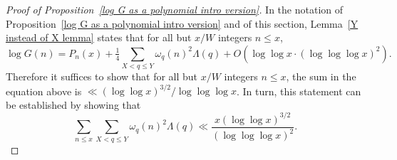 \documentclass[12pt,reqno]{amsart}
\theoremstyle{definition}
\begin{document}
\begin{proof}[Proof of Proposition~\ref{log G as a polynomial intro version}]
In the notation of Proposition~\ref{log G as a polynomial intro version} and of this section, Lemma~\ref{Y instead of X lemma} states that for all but $x/W$ integers $n\le x$,
\begin{equation*}
\log G(n) = P_n(x) + \tfrac14 \sum_{X < q \le Y} \omega_q(n)^2 \Lambda(q) + O(\log\log x\cdot(\log\log\log x)^2).
\end{equation*}
Therefore it suffices to show that for all but $x/W$ integers $n\le x$, the sum in the equation above is $\ll (\log\log x)^{3/2}/\log\log\log x$. In turn, this statement can be established by showing that
\begin{equation}  \label{log G as a polynomial estimate}
\sum_{n\le x} \sum_{X < q \le Y} \omega_q(n)^2 \Lambda(q) \ll \frac{x(\log\log x)^{3/2}}{(\log\log\log x)^2}.
\end{equation}


\end{proof}
\end{document}
